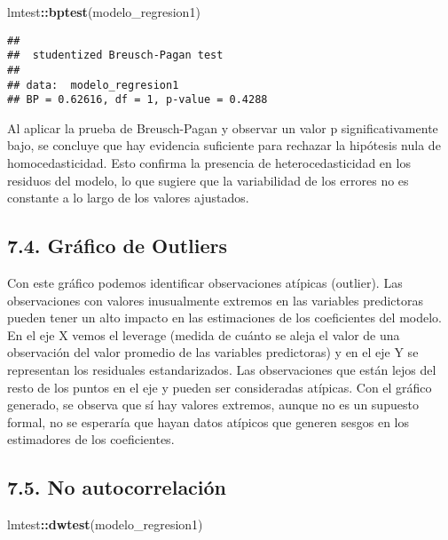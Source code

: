 \documentclass[
]{article}
\newenvironment{Shaded}{\begin{snugshade}}{\end{snugshade}}
\newcommand{\FunctionTok}[1]{\textcolor[rgb]{0.13,0.29,0.53}{\textbf{#1}}}
\newcommand{\NormalTok}[1]{#1}
\newcommand{\SpecialCharTok}[1]{\textcolor[rgb]{0.81,0.36,0.00}{\textbf{#1}}}
\begin{document}
\begin{Shaded}
\begin{Highlighting}[]
\NormalTok{lmtest}\SpecialCharTok{::}\FunctionTok{bptest}\NormalTok{(modelo\_regresion1)}
\end{Highlighting}
\end{Shaded}

\begin{verbatim}
## 
##  studentized Breusch-Pagan test
## 
## data:  modelo_regresion1
## BP = 0.62616, df = 1, p-value = 0.4288
\end{verbatim}

Al aplicar la prueba de Breusch-Pagan y observar un valor p
significativamente bajo, se concluye que hay evidencia suficiente para
rechazar la hipótesis nula de homocedasticidad. Esto confirma la
presencia de heterocedasticidad en los residuos del modelo, lo que
sugiere que la variabilidad de los errores no es constante a lo largo de
los valores ajustados.

\subsection{\texorpdfstring{\textbf{7.4. Gráfico de
Outliers}}{7.4. Gráfico de Outliers}}\label{gruxe1fico-de-outliers}

Con este gráfico podemos identificar observaciones atípicas (outlier).
Las observaciones con valores inusualmente extremos en las variables
predictoras pueden tener un alto impacto en las estimaciones de los
coeficientes del modelo. En el eje X vemos el leverage (medida de cuánto
se aleja el valor de una observación del valor promedio de las variables
predictoras) y en el eje Y se representan los residuales estandarizados.
Las observaciones que están lejos del resto de los puntos en el eje y
pueden ser consideradas atípicas. Con el gráfico generado, se observa
que sí hay valores extremos, aunque no es un supuesto formal, no se
esperaría que hayan datos atípicos que generen sesgos en los estimadores
de los coeficientes.

\subsection{\texorpdfstring{\textbf{7.5. No
autocorrelación}}{7.5. No autocorrelación}}\label{no-autocorrelaciuxf3n}

\begin{Shaded}
\begin{Highlighting}[]
\NormalTok{lmtest}\SpecialCharTok{::}\FunctionTok{dwtest}\NormalTok{(modelo\_regresion1)}
\end{Highlighting}
\end{Shaded}
\end{document}

